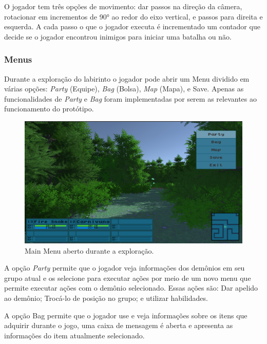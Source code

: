 \documentclass[
	12pt,				%
	openright,			%
	twoside,			%
	a4paper,			%
	english,			%
	french,				%
	spanish,			%
	brazil				%
	]{abntex2}
\begin{document}
O jogador tem três opções de movimento: dar passos na direção da câmera, rotacionar em incrementos de 90° ao redor do eixo vertical, e passos para direita e esquerda.
A cada passo o que o jogador executa é incrementado um contador que decide se o jogador encontrou inimigos para iniciar uma batalha ou não.

\subsubsection{Menus}

Durante a exploração do labirinto o jogador pode abrir um Menu dividido em várias opções: \emph{Party} (Equipe), \emph{Bag} (Bolsa), \emph{Map} (Mapa), e Save. Apenas as funcionalidades de \emph{Party} e \emph{Bag} foram implementadas por serem as relevantes ao funcionamento do protótipo.

\begin{figure}[h!]
  \includegraphics[width=\linewidth]{mainmenu.jpg}
  \caption{Main Menu aberto durante a exploração.}
  \label{fig:menu1}
\end{figure}

A opção \emph{Party} permite que o jogador veja informações dos demônios em seu grupo atual e os selecione para executar ações por meio de um novo menu que permite executar ações com o demônio selecionado. Essas ações são: Dar apelido ao demônio; Trocá-lo de posição no grupo; e utilizar habilidades.

A opção Bag permite que o jogador use e veja informações sobre os itens que adquirir durante o jogo, uma caixa de mensagem é aberta e apresenta as informações do item atualmente selecionado.
\end{document}
